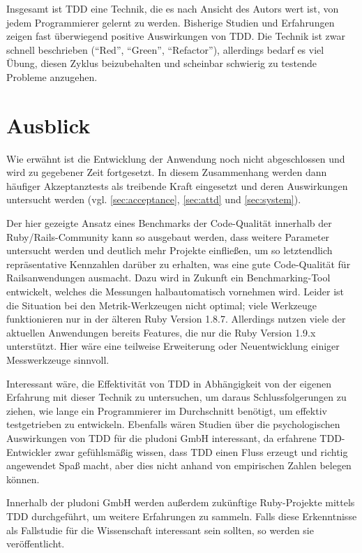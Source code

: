 Insgesamt ist TDD eine Technik, die es nach Ansicht des Autors wert ist, von jedem Programmierer gelernt zu werden. Bisherige Studien und Erfahrungen zeigen fast überwiegend positive Auswirkungen von TDD. Die Technik ist zwar schnell beschrieben ("`Red"', "`Green"', "`Refactor"'), allerdings bedarf es viel Übung, diesen Zyklus beizubehalten und scheinbar schwierig zu testende Probleme anzugehen.

\section{Ausblick}
Wie erwähnt ist die Entwicklung der Anwendung noch nicht abgeschlossen und wird zu gegebener Zeit fortgesetzt. In diesem Zusammenhang werden dann häufiger Akzeptanztests als treibende Kraft eingesetzt und deren Auswirkungen untersucht werden (vgl. \ref{sec:acceptance}, \ref{sec:attd} und \ref{sec:system}).

Der hier gezeigte Ansatz eines Benchmarks der Code-Qualität innerhalb der Ruby/Rails\hyp{}Community kann so ausgebaut werden, dass weitere Parameter untersucht werden und deutlich mehr Projekte einfließen, um so letztendlich repräsentative Kennzahlen darüber zu erhalten, was eine gute Code-Qualität für Railsanwendungen ausmacht. Dazu wird in Zukunft ein Benchmarking\hyp{}Tool entwickelt, welches die Messungen halbautomatisch vornehmen wird. Leider ist die Situation bei den Metrik-Werkzeugen nicht optimal; viele Werkzeuge funktionieren nur in der älteren Ruby Version 1.8.7. Allerdings nutzen viele der aktuellen Anwendungen bereits Features, die nur die Ruby Version 1.9.x unterstützt. Hier wäre eine teilweise Erweiterung oder Neuentwicklung einiger Messwerkzeuge sinnvoll.

Interessant wäre, die Effektivität von TDD in Abhängigkeit von der eigenen Erfahrung mit dieser Technik zu untersuchen, um daraus Schlussfolgerungen zu ziehen, wie lange ein Programmierer im Durchschnitt benötigt, um effektiv testgetrieben zu entwickeln. Ebenfalls wären Studien über die psychologischen Auswirkungen von TDD für die pludoni GmbH interessant, da erfahrene TDD-Entwickler zwar gefühlsmäßig wissen, dass TDD einen Fluss erzeugt und richtig angewendet Spaß macht, aber dies nicht anhand von empirischen Zahlen belegen können.

Innerhalb der pludoni GmbH werden außerdem zukünftige Ruby-Projekte mittels TDD durchgeführt, um weitere Erfahrungen zu sammeln. Falls diese Erkenntnisse als Fallstudie für die Wissenschaft interessant sein sollten, so werden sie veröffentlicht.

